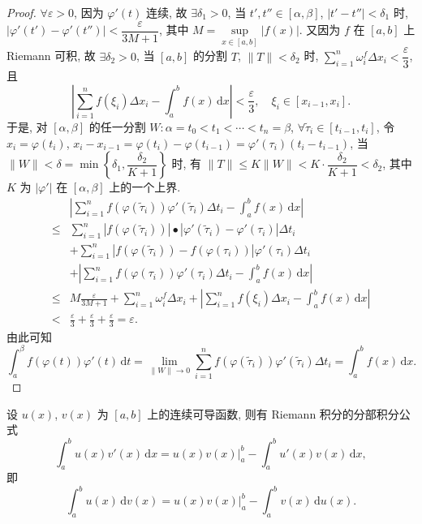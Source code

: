 \begin{proof}
$\forall\varepsilon>0$, 因为 $\varphi'(t)$ 连续, 故 $\exists\delta_{1}>0$, 当 $t',t''\in[\alpha,\beta]$, $|t'-t''|<\delta_{1}$ 时, $|\varphi'(t')-\varphi'(t'')|<\dfrac{\varepsilon}{3M+1}$, 其中 $M=\sup\limits_{x\in[a,b]}|f(x)|$. 又因为 $f$ 在 $[a,b]$ 上 Riemann 可积, 故 $\exists\delta_{2}>0$, 当 $[a,b]$ 的分割 $T$, $\|T\|<\delta_{2}$ 时, $\sum\limits_{i=1}^{n}\omega_{i}^{f}\Delta x_{i}<\dfrac{\varepsilon}{3}$, 且
\[
\left|\sum_{i=1}^{n}f(\xi_{i})\Delta x_{i}-\int_{a}^{b}f(x)\,\mathrm{d}x\right|<\frac{\varepsilon}{3},\quad\xi_{i}\in[x_{i-1},x_{i}].
\]
于是, 对 $[\alpha,\beta]$ 的任一分割 $W:\alpha=t_{0}<t_{1}<\cdots<t_{n}=\beta$, $\forall\tilde{\tau}_{i}\in[t_{i-1},t_{i}]$, 令 $x_{i}=\varphi(t_{i})$, $x_{i}-x_{i-1}=\varphi(t_{i})-\varphi(t_{i-1})=\varphi'(\tau_{i})(t_{i}-t_{i-1})$, 当 $\|W\|<\delta=\min\left\{\delta_{1},\dfrac{\delta_{2}}{K+1}\right\}$ 时, 有 $\|T\|\leqslant K\|W\|<K\cdot\dfrac{\delta_{2}}{K+1}<\delta_{2}$, 其中 $K$ 为 $|\varphi'|$ 在 $[\alpha,\beta]$ 上的一个上界.
\begin{align*}
&\left|\sum_{i=1}^{n}f(\varphi(\tilde{\tau}_{i}))\varphi'(\tilde{\tau}_{i})\Delta t_{i}-\int_{a}^{b}f(x)\,\mathrm{d}x\right|\\
\leqslant{}&\sum_{i=1}^{n}\left|f(\varphi(\tilde{\tau}_{i}))\right|\bullet\left|\varphi'(\tilde{\tau}_{i})-\varphi'(\tau_{i})\right|\Delta t_{i}\\
&+\sum_{i=1}^{n}\left|f(\varphi(\tilde{\tau}_{i}))-f(\varphi(\tau_{i}))\right|\varphi'(\tau_{i})\Delta t_{i}\\
&+\left|\sum_{i=1}^{n}f(\varphi(\tau_{i}))\varphi'(\tau_{i})\Delta t_{i}-\int_{a}^{b}f(x)\,\mathrm{d}x\right|\\
\leqslant{}&M\frac{\varepsilon}{3M+1}+\sum_{i=1}^{n}\omega_{i}^{f}\Delta x_{i}+\left|\sum_{i=1}^{n}f(\xi_{i})\Delta x_{i}-\int_{a}^{b}f(x)\,\mathrm{d}x\right|\\
<{}&\frac{\varepsilon}{3}+\frac{\varepsilon}{3}+\frac{\varepsilon}{3}=\varepsilon.
\end{align*}
由此可知
\[
\int_{a}^{\beta}f(\varphi(t))\varphi'(t)\,\mathrm{d}t=\lim_{\|W\|\to0}\sum_{i=1}^{n}f(\varphi(\tilde{\tau}_{i}))\varphi'(\tilde{\tau}_{i})\Delta t_{i}=\int_{a}^{b}f(x)\,\mathrm{d}x.
\]
\end{proof}

\begin{theorem}\label{thm:6.4.2}
设 $u(x)$, $v(x)$ 为 $[a,b]$ 上的连续可导函数, 则有 Riemann 积分的分部积分公式
\[
\int_{a}^{b}u(x)v'(x)\,\mathrm{d}x=u(x)v(x)\Big|_{a}^{b}-\int_{a}^{b}u'(x)v(x)\,\mathrm{d}x,
\]
即
\[
\int_{a}^{b}u(x)\,\mathrm{d}v(x)=u(x)v(x)\Big|_{a}^{b}-\int_{a}^{b}v(x)\,\mathrm{d}u(x).
\]
\end{theorem}

